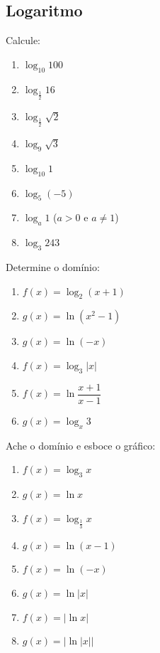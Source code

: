 \clearpage

\subsection{Logaritmo}

\begin{exercicio}[1]
Calcule:
\begin{enumerate}[label=\alph*)]
    \item $\log_{10} 100$
    \item $\log_{\frac{1}{2}} 16$
    \item $\log_{\frac{1}{2}} \sqrt{2}$
    \item $\log_9 \sqrt{3}$
    \item $\log_{10} 1$
    \item $\log_5 (-5)$
    \item $\log_a 1$ ($a > 0$ e $a \neq 1$)
    \item $\log_3 243$
\end{enumerate}
\end{exercicio}

\begin{exercicio}[2]
Determine o domínio:
\begin{enumerate}[label=\alph*)]
    \item $f(x) = \log_2 (x + 1)$
    \item $g(x) = \ln(x^2 - 1)$
    \item $g(x) = \ln(-x)$
    \item $f(x) = \log_3 |x|$
    \item $f(x) = \ln\dfrac{x + 1}{x - 1}$
    \item $g(x) = \log_x 3$
\end{enumerate}
\end{exercicio}

\begin{exercicio}[3]
Ache o domínio e esboce o gráfico:
\begin{enumerate}[label=\alph*)]
    \item $f(x) = \log_3 x$
    \item $g(x) = \ln x$
    \item $f(x) = \log_{\frac{1}{3}} x$
    \item $g(x) = \ln(x - 1)$
    \item $f(x) = \ln(-x)$
    \item $g(x) = \ln |x|$
    \item $f(x) = |\ln x|$
    \item $g(x) = |\ln |x||$
\end{enumerate}
\end{exercicio}

